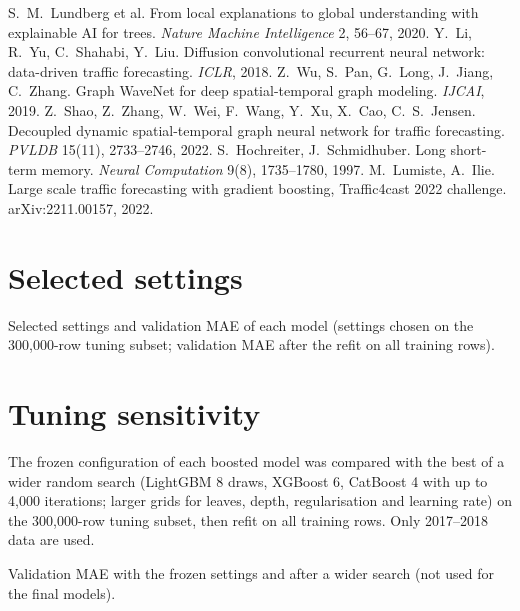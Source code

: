 \documentclass[11pt,a4paper]{article}
\begin{document}
\begin{thebibliography}{99}
 S.~M.~Lundberg et al. From local explanations to global understanding with explainable AI for trees. \emph{Nature Machine Intelligence} 2, 56--67, 2020.
 Y.~Li, R.~Yu, C.~Shahabi, Y.~Liu. Diffusion convolutional recurrent neural network: data-driven traffic forecasting. \emph{ICLR}, 2018.
 Z.~Wu, S.~Pan, G.~Long, J.~Jiang, C.~Zhang. Graph WaveNet for deep spatial-temporal graph modeling. \emph{IJCAI}, 2019.
 Z.~Shao, Z.~Zhang, W.~Wei, F.~Wang, Y.~Xu, X.~Cao, C.~S.~Jensen. Decoupled dynamic spatial-temporal graph neural network for traffic forecasting. \emph{PVLDB} 15(11), 2733--2746, 2022.
 S.~Hochreiter, J.~Schmidhuber. Long short-term memory. \emph{Neural Computation} 9(8), 1735--1780, 1997.
 M.~Lumiste, A.~Ilie. Large scale traffic forecasting with gradient boosting, Traffic4cast 2022 challenge. arXiv:2211.00157, 2022.
\end{thebibliography}

\appendix
\section{Selected settings}\label{app:set}
\begin{table}[H]\centering\scriptsize

\caption{Selected settings and validation MAE of each model (settings chosen on the 300{,}000-row tuning subset; validation MAE after the refit on all training rows).}\label{tab:tuning}
\end{table}

\section{Tuning sensitivity}\label{app:sens}
The frozen configuration of each boosted model was compared with the best of a wider random search (LightGBM 8 draws, XGBoost 6, CatBoost 4 with up to 4{,}000 iterations; larger grids for leaves, depth, regularisation and learning rate) on the 300{,}000-row tuning subset, then refit on all training rows. Only 2017--2018 data are used.
\begin{table}[H]\centering\small

\caption{Validation MAE with the frozen settings and after a wider search (not used for the final models).}\label{tab:sens}
\end{table}
\end{document}
